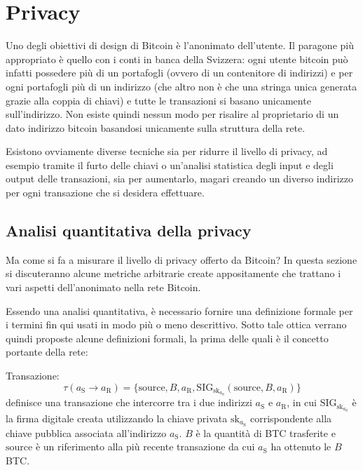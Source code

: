 \chapter{Privacy}\label{privacy}

Uno degli obiettivi di design di Bitcoin è l'anonimato dell'utente. Il paragone più appropriato è quello con i conti in banca della Svizzera: ogni utente bitcoin può infatti possedere più di un portafogli (ovvero di un contenitore di indirizzi) e per ogni portafogli più di un indirizzo (che altro non è che una stringa unica generata grazie alla coppia di chiavi) e tutte le transazioni si basano unicamente sull'indirizzo. Non esiste quindi nessun modo per risalire al proprietario di un dato indirizzo bitcoin basandosi unicamente sulla struttura della rete.

Esistono ovviamente diverse tecniche sia per ridurre il livello di privacy, ad esempio tramite il furto delle chiavi o un'analisi statistica degli input e degli output delle transazioni, sia per aumentarlo, magari creando un diverso indirizzo per ogni transazione che si desidera effettuare.

\section{Analisi quantitativa della privacy}\label{analisi-quantitativa-della-privacy}

Ma come si fa a misurare il livello di privacy offerto da Bitcoin? In questa sezione si discuteranno alcune metriche arbitrarie create appositamente che trattano i vari aspetti dell'anonimato nella rete Bitcoin.

Essendo una analisi quantitativa, è necessario fornire una definizione formale per i termini fin qui usati in modo più o meno descrittivo. Sotto tale ottica verrano quindi proposte alcune definizioni formali, la prima delle quali è il concetto portante della rete:

Transazione:
\[\tau(a_{\textrm{S}} \rightarrow a_{\textrm{R}}) = \{ \textrm{source}, B, a_{\textrm{R}}, \textrm{SIG}_{\textrm{sk}_{a_{\textrm{S}}}}\left(\textrm{source}, B, a_{\textrm{R}}\right) \} \]
definisce una transazione che intercorre tra i due indirizzi $a_{\textrm{S}}$ e $a_{\textrm{R}}$, in cui $\textrm{SIG}_{\textrm{sk}_{a_{\textrm{S}}}}$ è la firma digitale creata utilizzando la chiave privata $\textrm{sk}_{a_\textrm{S}}$ corrispondente alla chiave pubblica associata all'indirizzo $a_\textrm{S}$. $B$ è la quantità di BTC trasferite e $\textrm{source}$ è un riferimento alla più recente transazione da cui $a_\textrm{S}$ ha ottenuto le $B$ BTC.

